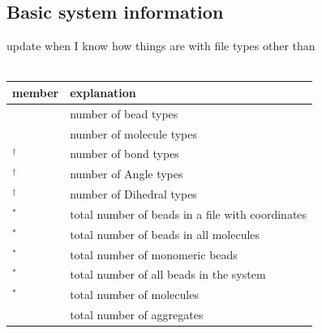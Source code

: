 \subsection[Counts]{Basic system information}\label{ssec:Counts}
\TODO update when I know how things are with file types other than \vtf\\
\\
\vspace{-1.75em}
\begin{longtable}{L{0.36\textwidth}p{0.685\textwidth}}
  \toprule
  member           & explanation \\
  \midrule
             & number of bead types\\
         & number of molecule types\\
  $^\dag$    & number of bond types\\
  $^\dag$   & number of Angle types\\
  $^\dag$ & number of Dihedral types\\
  $^*$              & total number of beads in a file with
                                      coordinates\\
  $^*$             & total number of beads in all molecules\\
  $^*$           & total number of monomeric beads\\
  $^*$         & total number of all beads in the system\\
  $^*$          & total number of molecules\\
               & total number of aggregates\\
  \bottomrule
\end{longtable}

